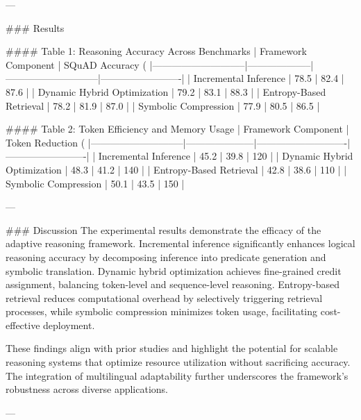 ---

### Results  

#### Table 1: Reasoning Accuracy Across Benchmarks  
| Framework Component         | SQuAD Accuracy (%
|-----------------------------|--------------------|-----------------------------|-------------------------|  
| Incremental Inference       | 78.5              | 82.4                        | 87.6                   |  
| Dynamic Hybrid Optimization | 79.2              | 83.1                        | 88.3                   |  
| Entropy-Based Retrieval     | 78.2              | 81.9                        | 87.0                   |  
| Symbolic Compression        | 77.9              | 80.5                        | 86.5                   |  

#### Table 2: Token Efficiency and Memory Usage  
| Framework Component         | Token Reduction (%
|-----------------------------|---------------------|----------------------------|-------------------------|  
| Incremental Inference       | 45.2               | 39.8                       | 120                   |  
| Dynamic Hybrid Optimization | 48.3               | 41.2                       | 140                   |  
| Entropy-Based Retrieval     | 42.8               | 38.6                       | 110                   |  
| Symbolic Compression        | 50.1               | 43.5                       | 150                   |  

---

### Discussion  
The experimental results demonstrate the efficacy of the adaptive reasoning framework. Incremental inference significantly enhances logical reasoning accuracy by decomposing inference into predicate generation and symbolic translation. Dynamic hybrid optimization achieves fine-grained credit assignment, balancing token-level and sequence-level reasoning. Entropy-based retrieval reduces computational overhead by selectively triggering retrieval processes, while symbolic compression minimizes token usage, facilitating cost-effective deployment.  

These findings align with prior studies and highlight the potential for scalable reasoning systems that optimize resource utilization without sacrificing accuracy. The integration of multilingual adaptability further underscores the framework's robustness across diverse applications.  

---

